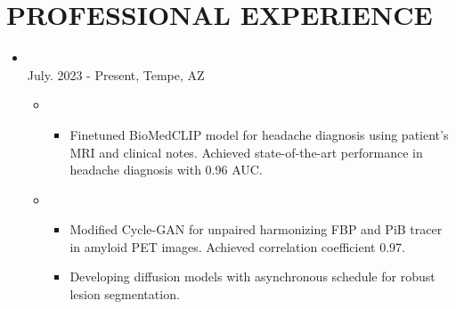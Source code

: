 \documentclass[10pt]{article}
\begin{document}
\vspace{-2em}
\section*{PROFESSIONAL EXPERIENCE}
\vspace{-0.5em}

\begin{itemize}
	\setlength\itemsep{0.5pt}

	\item {}\\
		\hfill{July. 2023 - Present, Tempe, AZ}
		\vspace{-0.5em}
		\begin{itemize}[label=$\bullet$]
			\item {}
            \vspace{-0.5em}
            \begin{itemize}[label=$-$]
				\setlength\itemsep{0.5pt}
				\item Finetuned BioMedCLIP model for headache diagnosis using patient's MRI and clinical notes. Achieved state-of-the-art performance in headache diagnosis with 0.96 AUC.
			\end{itemize}

			\item {} 
            \vspace{-0.5em}
			\begin{itemize}[label=$-$]
				\setlength\itemsep{0.5pt}
				\item Modified Cycle-GAN for unpaired harmonizing FBP and PiB tracer in amyloid PET images. Achieved correlation coefficient 0.97.
				\item Developing diffusion models with asynchronous schedule for robust lesion segmentation.
			\end{itemize}

		\end{itemize}
		


\end{itemize}
\end{document}

